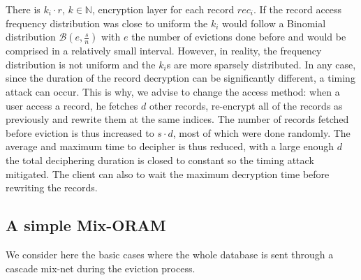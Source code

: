 \documentclass{llncs}
\begin{document}
There is $k_i \cdot r$, $k\in \mathbb{N}$, encryption layer for each record $rec_i$. If the record access frequency distribution was close to uniform the $k_i$ would follow a Binomial distribution $\mathcal{B}\left ( e, \frac{s}{n}\right )$ with $e$ the number of evictions done before and would be comprised in a relatively small interval. However, in reality, the frequency distribution is not uniform and the $k_i$s are more sparsely distributed. In any case, since the duration of the record decryption can be significantly different, a timing attack can occur. This is why, we advise to change the access method: when a user access a record, he fetches $d$ other records, re-encrypt all of the records as previously and rewrite them at the same indices. The number of records fetched before eviction is thus increased to $s\cdot d$, most of which were done randomly. The average and maximum time to decipher is thus reduced, with a large enough $d$ the total deciphering duration is closed to constant so the timing attack mitigated. The client can also to wait the maximum decryption time before rewriting the records.

\subsection{A simple Mix-ORAM}\label{SMO}
%
We consider here the basic cases where the whole database is sent through a cascade mix-net during the eviction process.\\
\end{document}
